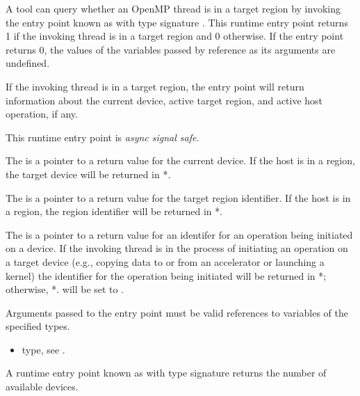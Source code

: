 \descr
A tool can query whether an OpenMP thread is in a target region by
invoking the entry point known as  
with type signature .
This runtime entry point returns 1 if the invoking thread is
in a target region and 0 otherwise. If the entry point returns 0,
the values of the variables passed by reference as its arguments
are undefined.

If the invoking thread is in a target region, the entry point will
return information about the current device, active target region, and
active host operation, if any.

This runtime entry point is \emph{async signal safe}.

\argdesc

The \callbackarg{}  is a pointer to a return value for
the current device. If the host is in a  region, 
the target device will be returned in *.

The \callbackarg{}  is a pointer to a return value for
the target region identifier. If the host is in a  region, 
the  region identifier will be returned in *.

The \callbackarg{}  is a pointer to a return value
for an identifer for an operation being initiated on a 
device.  If the invoking thread is in the process of initiating an
operation on a target device (e.g., copying data to or from an
accelerator or launching a kernel) the identifier for the operation
being initiated will be returned in *; otherwise,
*.  will be set to .

\constraints

Arguments passed to the entry point must be valid
references to variables of the specified types.

\crossreferences
\begin{itemize}
\item {} type, see .
\end{itemize}

\label{sec:ompt_get_num_devices_t}
\label{sec:ompt_get_num_devices}

\summary
A runtime entry point known as  
with type signature  
returns the number of available devices.

